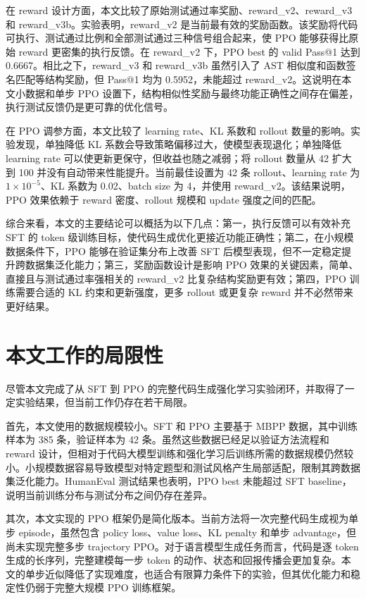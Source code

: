 在 reward 设计方面，本文比较了原始测试通过率奖励、reward\_v2、reward\_v3 和 reward\_v3b。实验表明，reward\_v2 是当前最有效的奖励函数。该奖励将代码可执行、测试通过比例和全部测试通过三种信号组合起来，使 PPO 能够获得比原始 reward 更密集的执行反馈。在 reward\_v2 下，PPO best 的 valid Pass@1 达到 0.6667。相比之下，reward\_v3 和 reward\_v3b 虽然引入了 AST 相似度和函数签名匹配等结构奖励，但 Pass@1 均为 0.5952，未能超过 reward\_v2。这说明在本文小数据和单步 PPO 设置下，结构相似性奖励与最终功能正确性之间存在偏差，执行测试反馈仍是更可靠的优化信号。

在 PPO 调参方面，本文比较了 learning rate、KL 系数和 rollout 数量的影响。实验发现，单独降低 KL 系数会导致策略偏移过大，使模型表现退化；单独降低 learning rate 可以使更新更保守，但收益也随之减弱；将 rollout 数量从 42 扩大到 100 并没有自动带来性能提升。当前最佳设置为 42 条 rollout、learning rate 为 $1\times10^{-5}$、KL 系数为 0.02、batch size 为 4，并使用 reward\_v2。该结果说明，PPO 效果依赖于 reward 密度、rollout 规模和 update 强度之间的匹配。

综合来看，本文的主要结论可以概括为以下几点：第一，执行反馈可以有效补充 SFT 的 token 级训练目标，使代码生成优化更接近功能正确性；第二，在小规模数据条件下，PPO 能够在验证集分布上改善 SFT 后模型表现，但不一定稳定提升跨数据集泛化能力；第三，奖励函数设计是影响 PPO 效果的关键因素，简单、直接且与测试通过率强相关的 reward\_v2 比复杂结构奖励更有效；第四，PPO 训练需要合适的 KL 约束和更新强度，更多 rollout 或更复杂 reward 并不必然带来更好结果。

\section{本文工作的局限性}

尽管本文完成了从 SFT 到 PPO 的完整代码生成强化学习实验闭环，并取得了一定实验结果，但当前工作仍存在若干局限。

首先，本文使用的数据规模较小。SFT 和 PPO 主要基于 MBPP 数据，其中训练样本为 385 条，验证样本为 42 条。虽然这些数据已经足以验证方法流程和 reward 设计，但相对于代码大模型训练和强化学习后训练所需的数据规模仍然较小。小规模数据容易导致模型对特定题型和测试风格产生局部适配，限制其跨数据集泛化能力。HumanEval 测试结果也表明，PPO best 未能超过 SFT baseline，说明当前训练分布与测试分布之间仍存在差异。

其次，本文实现的 PPO 框架仍是简化版本。当前方法将一次完整代码生成视为单步 episode，虽然包含 policy loss、value loss、KL penalty 和单步 advantage，但尚未实现完整多步 trajectory PPO。对于语言模型生成任务而言，代码是逐 token 生成的长序列，完整建模每一步 token 的动作、状态和回报传播会更加复杂。本文的单步近似降低了实现难度，也适合有限算力条件下的实验，但其优化能力和稳定性仍弱于完整大规模 PPO 训练框架。

